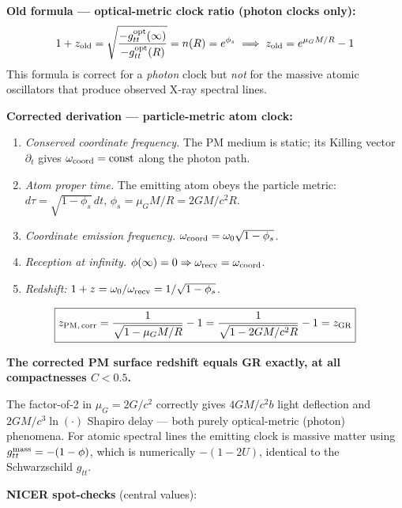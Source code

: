 \documentclass[10pt,twocolumn]{article}
\begin{document}
\textbf{Old formula — optical-metric clock ratio (photon clocks only):}
\[
  1+z_{\rm old}
  = \sqrt{\frac{-g_{tt}^{\rm opt}(\infty)}{-g_{tt}^{\rm opt}(R)}}
  = n(R) = e^{\phi_s}
  \implies z_{\rm old} = e^{\mu_G M/R} - 1
\]
This formula is correct for a \emph{photon} clock but \emph{not} for the
massive atomic oscillators that produce observed X-ray spectral lines.

\textbf{Corrected derivation — particle-metric atom clock:}

\begin{enumerate}\setlength\itemsep{0pt}
  \item \emph{Conserved coordinate frequency.} The PM medium is static;
    its Killing vector $\partial_t$ gives
    $\omega_{\rm coord} = \mathrm{const}$ along the photon path.
  \item \emph{Atom proper time.} The emitting atom obeys the particle
    metric: $d\tau = \sqrt{1-\phi_s}\,dt$, \;
    $\phi_s = \mu_G M/R = 2GM/c^2R$.
  \item \emph{Coordinate emission frequency.}
    $\omega_{\rm coord} = \omega_0\sqrt{1-\phi_s}$.
  \item \emph{Reception at infinity.} $\phi(\infty)=0 \Rightarrow
    \omega_{\rm recv} = \omega_{\rm coord}$.
  \item \emph{Redshift:}
    $1+z = \omega_0/\omega_{\rm recv} = 1/\sqrt{1-\phi_s}$.
\end{enumerate}
\[
  \boxed{z_{\rm PM,\,corr}
  = \frac{1}{\sqrt{1 - \mu_G M/R}} - 1
  = \frac{1}{\sqrt{1 - 2GM/c^2 R}} - 1
  = z_{\rm GR}}
\]

\textbf{The corrected PM surface redshift equals GR exactly, at all
compactnesses $C < 0.5$.}

The factor-of-2 in $\mu_G = 2G/c^2$ correctly gives $4GM/c^2 b$
light deflection and $2GM/c^3\ln(\cdot)$ Shapiro delay — both purely
optical-metric (photon) phenomena.  For atomic spectral lines the
emitting clock is massive matter using $g_{tt}^{\rm mass} = -(1-\phi)$,
which is numerically $-(1-2U)$, identical to the Schwarzschild $g_{tt}$.

\textbf{NICER spot-checks} (central values):
\begin{center}
\end{center}
\end{document}
